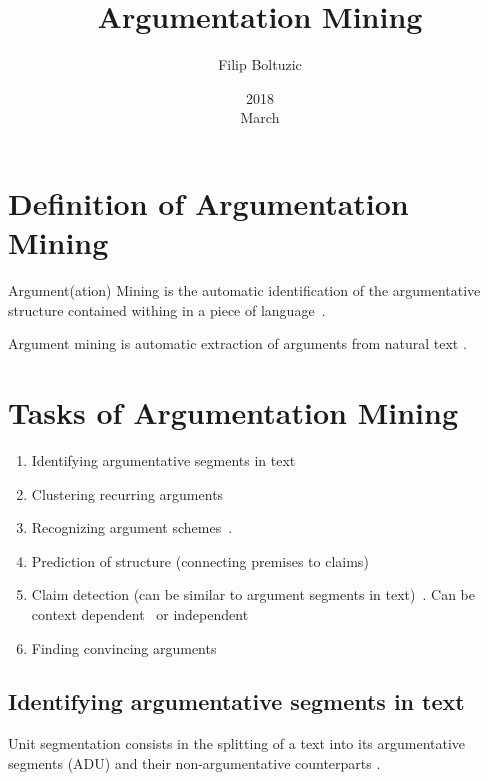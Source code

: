 \documentclass[a4paper,10pt]{article}
\title{Argumentation Mining}
\author{Filip Boltuzic}
\date{2018 \\ March}
\begin{document}
\maketitle

\tableofcontents

\section{Definition of Argumentation Mining}

Argument(ation) Mining is the automatic identification of the argumentative
structure contained withing in a piece of language~\cite{Lawrence2017}.

Argument mining is automatic extraction of arguments from natural text
\cite{Aker2017}.

\section{Tasks of Argumentation Mining}

\begin{enumerate}
  \item Identifying argumentative segments in text~\cite{Ajjour2017, stab2017argumentative}

  \item Clustering recurring arguments~\cite{boltuvzic2015identifying,
   misra2017using} 
   
  \item Recognizing argument schemes~\cite{feng2011classifying}. 

  \item Prediction of structure (connecting premises to claims)~\cite{Aker2017,
   Lawrence2017}

 \item Claim detection (can be similar to argument segments in text)~\cite{Levy2017}. 
   Can be context dependent~\cite{levy2014context} or independent~\cite{lippi2015context}

 \item Finding convincing arguments~\cite{Simpson}
   
\end{enumerate}

\subsection{Identifying argumentative segments in text}
\label{subsec:argseg}

\noindent Unit segmentation consists in the splitting of a text into its
argumentative segments (ADU) and their non-argumentative counterparts 
\cite{Ajjour2017}.
\end{document}
